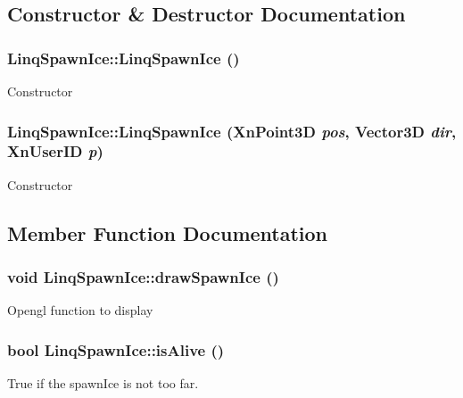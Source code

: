 \subsection{Constructor \& Destructor Documentation}
\hypertarget{classLinqSpawnIce_a2cc89b811caf7c8e5e70bd95448e4440}{
\subsubsection[{LinqSpawnIce}]{\setlength{\rightskip}{0pt plus 5cm}LinqSpawnIce::LinqSpawnIce ()}}
\label{classLinqSpawnIce_a2cc89b811caf7c8e5e70bd95448e4440}
Constructor \hypertarget{classLinqSpawnIce_a77656fb466afa730c8e1b885c6d2b78b}{
\subsubsection[{LinqSpawnIce}]{\setlength{\rightskip}{0pt plus 5cm}LinqSpawnIce::LinqSpawnIce (XnPoint3D {\em pos}, \/  {\bf Vector3D} {\em dir}, \/  XnUserID {\em p})}}
\label{classLinqSpawnIce_a77656fb466afa730c8e1b885c6d2b78b}
Constructor 

\subsection{Member Function Documentation}
\hypertarget{classLinqSpawnIce_a07a8f94c11e0330e2cc4707c56f5cf6d}{
\subsubsection[{drawSpawnIce}]{\setlength{\rightskip}{0pt plus 5cm}void LinqSpawnIce::drawSpawnIce ()}}
\label{classLinqSpawnIce_a07a8f94c11e0330e2cc4707c56f5cf6d}
Opengl function to display \hypertarget{classLinqSpawnIce_a105bc2e17ead7417ab2f913b246db5d0}{
\subsubsection[{isAlive}]{\setlength{\rightskip}{0pt plus 5cm}bool LinqSpawnIce::isAlive ()}}
\label{classLinqSpawnIce_a105bc2e17ead7417ab2f913b246db5d0}
True if the spawnIce is not too far.

